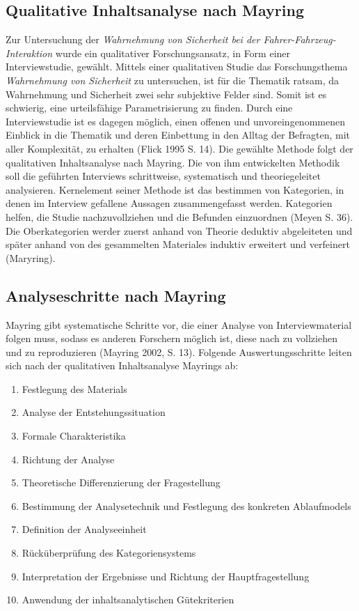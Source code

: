 \documentclass[12pt]{article}
\begin{document}
\subsection{Qualitative Inhaltsanalyse nach Mayring}

Zur Untersuchung der \emph{Wahrnehmung von Sicherheit bei der Fahrer-Fahrzeug-Interaktion} wurde ein qualitativer Forschungsansatz, in Form einer Interviewstudie, gewählt. Mittels einer qualitativen Studie das Forschungsthema \emph{Wahrnehmung von Sicherheit} zu untersuchen, ist für die Thematik ratsam, da Wahrnehmung und Sicherheit zwei sehr subjektive Felder sind. Somit ist es schwierig, eine urteilsfähige Parametrisierung zu finden. Durch eine Interviewstudie ist es dagegen möglich, einen offenen und unvoreingenommenen Einblick in die Thematik und deren Einbettung in den Alltag der Befragten, mit aller Komplexität, zu erhalten (Flick 1995 S. 14).
Die gewählte Methode folgt der qualitativen Inhaltsanalyse nach Mayring. Die von ihm entwickelten Methodik soll die geführten Interviews schrittweise, systematisch und theoriegeleitet analysieren. Kernelement seiner Methode ist das bestimmen von Kategorien, in denen im Interview gefallene Aussagen zusammengefasst werden. Kategorien helfen, \glqq die Studie nachzuvollziehen und die Befunden einzuordnen\grqq{} (Meyen S. 36). Die Oberkategorien werder zuerst anhand von Theorie deduktiv abgeleiteten und später anhand von des gesammelten Materiales induktiv erweitert und verfeinert (Maryring).

\subsection {Analyseschritte nach Mayring}

Mayring gibt systematische Schritte vor, die einer Analyse von Interviewmaterial folgen muss, sodass es anderen Forschern möglich ist, diese nach zu vollziehen und zu reproduzieren  (Mayring 2002, S. 13). Folgende Auswertungsschritte leiten sich nach der qualitativen Inhaltsanalyse Mayrings ab:

\begin{enumerate}
  \item Festlegung des Materials
  \item Analyse der Entstehungssituation
  \item Formale Charakteristika
  \item Richtung der Analyse
  \item Theoretische Differenzierung der Fragestellung
  \item Bestimmung der Analysetechnik und Festlegung des konkreten Ablaufmodels
  \item Definition der Analyseeinheit
  \item Rücküberprüfung des Kategoriensystems
  \item Interpretation der Ergebnisse und Richtung der Hauptfragestellung
  \item Anwendung der inhaltsanalytischen Gütekriterien
\end{enumerate}
\end{document}
